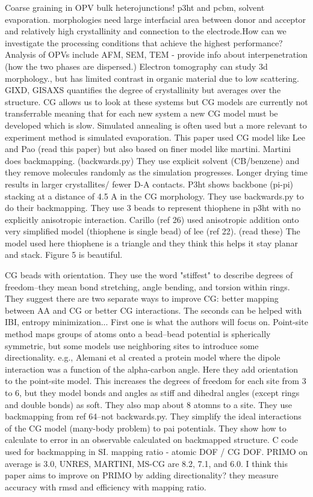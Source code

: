 \documentclass{article}
\begin{document}
Coarse graining in OPV bulk heterojunctions! p3ht and pcbm, solvent evaporation. morphologies need large interfacial area between donor and acceptor and relatively high crystallinity and connection to the electrode.How can we investigate the processing conditions that achieve the highest performance?
Analysis of OPVs include AFM, SEM, TEM - provide info about interpenetration (how the two phases are dispersed.) Electron tomography can study 3d morphology., but has limited contrast in organic material due to low scattering. GIXD, GISAXS quantifies the degree of crystallinity but averages over the structure. 
CG allows us to look at these systems but CG models are currently not transferrable meaning that for each new system a new CG model must be developed which is slow. Simulated annealing is often used but a more relevant to experiment method is simulated evaporation.
This paper used CG model like Lee and Pao (read this paper) but also based on finer model like martini. Martini does backmapping. (backwards.py) 
They use explicit solvent (CB/benzene) and they remove molecules randomly as the simulation progresses. Longer drying time results in larger crystallites/ fewer D-A contacts. P3ht shows backbone (pi-pi) stacking at a distance of 4.5 A in the CG morphology. They use backwards.py to do their backmapping. They use 3 beads to represent thiophene in p3ht with no explicitly anisotropic interaction. Carillo (ref 26) used anisotropic addition onto very simplified model (thiophene is single bead) of lee (ref 22). (read these) The model used here thiophene is a triangle and they think this helps it stay planar and stack.
Figure 5 is beautiful.

\cite{Haxton2015a}

CG beads with orientation. They use the word "stiffest" to describe degrees of freedom--they mean bond stretching, angle bending, and torsion within rings. They suggest there are two separate ways to improve CG: better mapping between AA and CG or better CG interactions. The seconds can be helped with IBI, entropy minimization... First one is what the authors will focus on.
Point-site method maps groups of atoms onto a bead--bead potential is spherically symmetric, but some models use neighboring sites to introduce some directionality. e.g., Alemani et al created a protein model where the dipole interaction was a function of the alpha-carbon angle. Here they add orientation to the point-site model. This increases the degrees of freedom for each site from 3 to 6, but they model bonds and angles as stiff and dihedral angles (except rings and double bonds) as soft. They also map about 8 atomns to a site. They use backmapping from ref 64--not backwards.py. 
They simplify the ideal interactions of the CG model (many-body problem) to pai potentials. They show how to calculate to error in an observable calculated on backmapped structure. C code used for backmapping in SI.
mapping ratio - atomic DOF / CG DOF. PRIMO on average is 3.0, UNRES, MARTINI, MS-CG are 8.2, 7.1, and 6.0. I think this paper aims to improve on PRIMO by adding directionality? they measure accuracy with rmsd and efficiency with mapping ratio.
\end{document}
